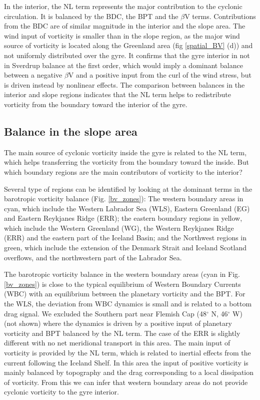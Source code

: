 \documentclass{ametsoc}
\begin{document}
In the interior, the NL term represents the major contribution to the cyclonic circulation. It is balanced by the BDC, the BPT and the $\beta$V terms. Contributions from the BDC are of similar magnitude in the interior and the slope area. The wind input of vorticity is smaller than in the slope region, as the major wind source of vorticity is located along the Greenland area (fig \ref{spatial_BV} (d)) and not uniformly distributed over the gyre. It confirms that the gyre interior in not in Sverdrup balance at the first order, which would imply a dominant balance between a negative $\beta$V and a positive input from the curl of the wind stress, but is driven instead by nonlinear effects. The comparison between balances in the interior and slope regions indicates that the NL term helps to redistribute vorticity from the boundary toward the interior of the gyre. %


\subsection{Balance in the slope area}

The main source of cyclonic vorticity inside the gyre is related to the NL term, which helps transferring the vorticity from the boundary toward the inside. But which boundary regions are the main contributors of vorticity to the interior? 

Several type of regions can be identified by looking at the dominant terms in the barotropic vorticity balance  (Fig. \ref{bv_zones}): The western boundary areas in cyan, which include the Western Labrador Sea (WLS), Eastern Greenland (EG) and Eastern Reykjanes Ridge (ERR); the eastern boundary regions in yellow, which include the Western Greenland (WG), the Western Reykjanes Ridge (ERR) and the eastern part of the Iceland Basin; and the Northwest regions in green, which include the extension of the Denmark Strait and Iceland Scotland overflows, and the northwestern part of the Labrador Sea.

The barotropic vorticity balance in the western boundary areas (cyan in Fig. \ref{bv_zones}) is close to the typical equilibrium of Western Boundary Currents (WBC) \citep{schoonover2016,gula2015} with an equilibrium between the planetary vorticity and the BPT. For the WLS, the deviation from WBC dynamics is small and is related to a bottom drag signal. We excluded the Southern part near Flemish Cap (48$^{\circ}$ N, 46$^{\circ}$ W) (not shown) where the dynamics is driven by a positive input of planetary vorticity and BPT balanced by the NL term. The case of the ERR is slightly different with  no net meridional transport in this area. The main input of vorticity is provided by the NL term, which is related to inertial effects from the current following the Iceland Shelf. In this area the input of positive vorticity is mainly balanced by topography and the drag corresponding to a local dissipation of vorticity. From this we can infer that western boundary areas do not provide cyclonic vorticity to the gyre interior.
\end{document}
